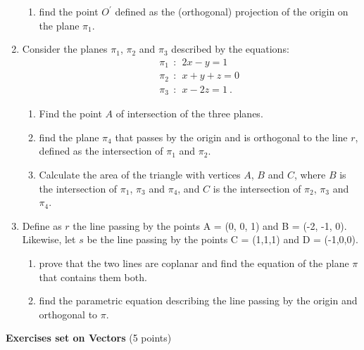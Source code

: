 \documentclass[fleqn]{article}
\begin{document}
\begin{enumerate}
\begin{enumerate}
    \item find the point $O^\prime$ defined as the (orthogonal) projection of the origin on the plane $\pi_1$. 
  \end{enumerate}

  \item Consider the planes $\pi_1$, $\pi_2$ and $\pi_3$ described by the equations: 
    \begin{eqnarray}
    &&\pi_1 ~~ :~~ 2x-y=1 \nonumber \\
    &&\pi_2 ~~ :~~ x+y+z=0 \nonumber \\
    &&\pi_3 ~~ :~~ x-2z=1 ~.\nonumber 
    \end{eqnarray}
    \begin{enumerate}
    \item Find the point $A$ of intersection of the three planes. 

    \item  find the plane $\pi_4 $ that passes by the origin and is orthogonal to the line $r$, defined as the intersection of $\pi_1$ and $\pi_2$. 

    \item Calculate the area of the triangle with vertices $A$, $B$ and $C$, where $B$ is the intersection of  $\pi_1$, $\pi_3$ and $\pi_4$, and $C$ is the intersection of $\pi_2$, $\pi_3$ and $\pi_4$. 

    \end{enumerate}


  \item Define as $r$ the line passing by the points A = (0, 0, 1) and B = (-2, -1, 0). Likewise, let $s$ be the line passing by the points C = (1,1,1) and D = (-1,0,0).
    \begin{enumerate}
    \item prove that the two lines are coplanar and find the equation of the plane $\pi$ that contains them both. 

    \item find the parametric equation describing the line passing by the origin and orthogonal to $\pi$. 
    \end{enumerate}

\end{enumerate}

\pagebreak

\textbf{Exercises set on Vectors} (5 points)
\end{document}
